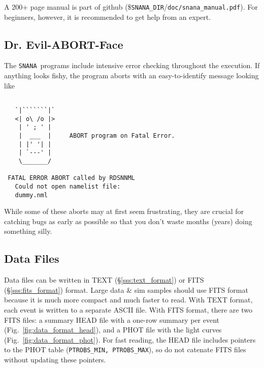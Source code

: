 \documentclass[12pt]{article}
\newcommand{\snana}{{\tt SNANA}}
\newcommand{\snanadir}{{\tt SNANA\_DIR}}
\begin{document}
{A 200+ page manual is part of github 
(\$\snanadir/{\tt doc/snana\_manual.pdf}).
For beginners, however, it is recommended to get help
from an expert.

\subsection{Dr. Evil-ABORT-Face}
\label{abort}

The \snana\ programs include intensive error checking throughout 
the execution. If anything looks fishy, 
the program aborts with an easy-to-identify message looking like
%
\begin{Verbatim}[frame=single]

   `|```````|`    
   <| o\ /o |>    
    | ' ; ' |     
    |  ___  |     ABORT program on Fatal Error. 
    | |' '| |     
    | `---' |     
    \_______/ 

 FATAL ERROR ABORT called by RDSNNML
   Could not open namelist file:
   dummy.nml   
\end{Verbatim}
%
While some of these aborts may at first seem frustrating,
they are crucial for catching bugs as early as possible
so that you don't waste months (years) doing something silly.


\subsection{Data Files}
\label{dataFiles}

Data files can be written in 
TEXT (\S\ref{sss:text_format}) or 
FITS (\S\ref{sss:fits_format}) 
format.
Large data \& sim samples should use FITS format because
it is much more compact and much faster to read.
With TEXT format, each event is written to a separate ASCII file.
With FITS format, there are two FITS files: a summary HEAD file
with a one-row summary per event (Fig.~\ref{fig:data_format_head}), 
and a PHOT file with the light curves (Fig.~\ref{fig:data_format_phot}).
For fast reading, the HEAD file includes pointers
to the PHOT table ({\tt PTROBS\_MIN, PTROBS\_MAX}), 
so do not catenate FITS files without updating these pointers.

}
\end{document}
